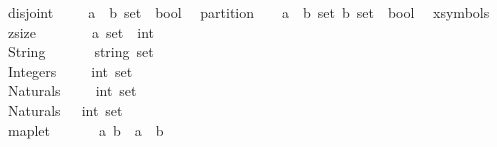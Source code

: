 \begin{isabellebody}
\ \ disjoint\ \ \ \ \ {\isacharcolon}{\isacharcolon}{\isachardoublequoteopen}{\isacharparenleft}{\isacharprime}a\ {\isacharless}{\isacharequal}{\isachargreater}\ {\isacharparenleft}{\isacharprime}b\ set{\isacharparenright}{\isacharparenright}\ {\isacharequal}{\isachargreater}\ bool{\isachardoublequoteclose}\isanewline
\ \ partition\ \ \ \ {\isacharcolon}{\isacharcolon}{\isachardoublequoteopen}{\isacharbrackleft}{\isacharparenleft}{\isacharprime}a\ {\isacharless}{\isacharequal}{\isachargreater}\ {\isacharparenleft}{\isacharprime}b\ set{\isacharparenright}{\isacharparenright}{\isacharcomma}\ {\isacharparenleft}{\isacharprime}b\ set{\isacharparenright}{\isacharbrackright}\ {\isacharequal}{\isachargreater}\ bool{\isachardoublequoteclose}\ {\isacharparenleft}\ {}{}{\isacharparenright}\isanewline
\isanewline
\isanewline
{}\isamarkupfalse%
{\isacharparenleft}xsymbols{\isacharparenright}\isanewline
\ \ zsize\ \ \ \ \ \ \ \ {\isacharcolon}{\isacharcolon}{\isachardoublequoteopen}{\isacharparenleft}{\isacharprime}a\ set{\isacharparenright}\ {\isacharequal}{\isachargreater}\ int{\isachardoublequoteclose}\ \ \ \ \ \ \ \ \ \ \ \ \ \ \ \ \ \ \ \ \ \ \ {\isacharparenleft}{\isachardoublequoteopen}{\isasymzsize}{\isachardoublequoteclose}\ {\isacharparenright}\isanewline
\ \ String\ \ \ \ \ \ \ {\isacharcolon}{\isacharcolon}{\isachardoublequoteopen}string\ set{\isachardoublequoteclose}\ \ \ \ \ \ \ \ \ \ \ \ \ \ \ \ \ \ \ \ \ \ \ \ \ \ \ \ {\isacharparenleft}{\isachardoublequoteopen}{\isasymString}{\isachardoublequoteclose}{\isacharparenright}\isanewline
\ \ Integers\ \ \ \ \ {\isacharcolon}{\isacharcolon}{\isachardoublequoteopen}int\ set{\isachardoublequoteclose}\ \ \ \ \ \ \ \ \ \ \ \ \ \ \ \ \ \ \ \ \ \ \ \ \ \ \ \ \ \ \ {\isacharparenleft}{\isachardoublequoteopen}{\isasymnum}{\isachardoublequoteclose}{\isacharparenright}\isanewline
\ \ Naturals\ \ \ \ \ {\isacharcolon}{\isacharcolon}{\isachardoublequoteopen}int\ set{\isachardoublequoteclose}\ \ \ \ \ \ \ \ \ \ \ \ \ \ \ \ \ \ \ \ \ \ \ \ \ \ \ \ \ \ \ {\isacharparenleft}{\isachardoublequoteopen}{\isasymnat}{\isachardoublequoteclose}{\isacharparenright}\isanewline
\ \ Naturals{\isacharunderscore}{}\ \ \ {\isacharcolon}{\isacharcolon}{\isachardoublequoteopen}int\ set{\isachardoublequoteclose}\ \ \ \ \ \ \ \ \ \ \ \ \ \ \ \ \ \ \ \ \ \ \ \ \ \ \ \ \ \ \ {\isacharparenleft}{\isachardoublequoteopen}{\isasymnatone}{\isachardoublequoteclose}{\isacharparenright}\isanewline
\ \ maplet\ \ \ \ \ \ \ {\isacharcolon}{\isacharcolon}{\isachardoublequoteopen}{\isacharbrackleft}{\isacharprime}a{\isacharcomma}\ {\isacharprime}b{\isacharbrackright}\ {\isacharequal}{\isachargreater}\ {\isacharparenleft}{\isacharprime}a\ {\isacharasterisk}\ {\isacharprime}b{\isacharparenright}{\isachardoublequoteclose}\ \ \ \ \ \ \ \ \ \ \ \ \ \ \ \ \ {\isacharparenleft}{\isachardoublequoteopen}{\isacharparenleft}{}{\isacharunderscore}\ {\isasymmapsto}{\isacharslash}\ {\isacharunderscore}{\isacharparenright}{\isachardoublequoteclose}\ {\isacharbrackleft}{}{}{\isacharcomma}{}{}{\isacharbrackright}\ {}{}{\isacharparenright}\ \isanewline

\end{isabellebody}
